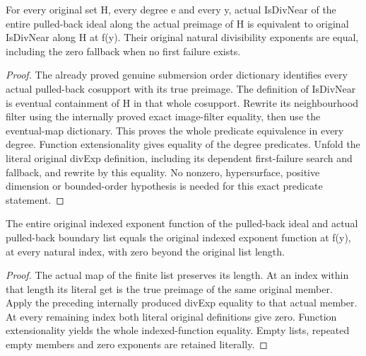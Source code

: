 \begin{theorem}\label{hir:submersion-actual-divisibility-exponents}
\leanok
For every original set H, every degree e and every y, actual IsDivNear of the entire pulled-back ideal along the actual preimage of H is equivalent to original IsDivNear along H at f(y). Their original natural divisibility exponents are equal, including the zero fallback when no first failure exists.
\end{theorem}
\begin{proof}
The already proved genuine submersion order dictionary identifies every actual pulled-back cosupport with its true preimage. The definition of IsDivNear is eventual containment of H in that whole cosupport. Rewrite its neighbourhood filter using the internally proved exact image-filter equality, then use the eventual-map dictionary. This proves the whole predicate equivalence in every degree. Function extensionality gives equality of the degree predicates. Unfold the literal original divExp definition, including its dependent first-failure search and fallback, and rewrite by this equality. No nonzero, hypersurface, positive dimension or bounded-order hypothesis is needed for this exact predicate statement.
\end{proof}

\begin{theorem}\label{hir:submersion-actual-indexed-exponents}
\leanok
The entire original indexed exponent function of the pulled-back ideal and actual pulled-back boundary list equals the original indexed exponent function at f(y), at every natural index, with zero beyond the original list length.
\end{theorem}
\begin{proof}
The actual map of the finite list preserves its length. At an index within that length its literal get is the true preimage of the same original member. Apply the preceding internally produced divExp equality to that actual member. At every remaining index both literal original definitions give zero. Function extensionality yields the whole indexed-function equality. Empty lists, repeated empty members and zero exponents are retained literally.
\end{proof}

